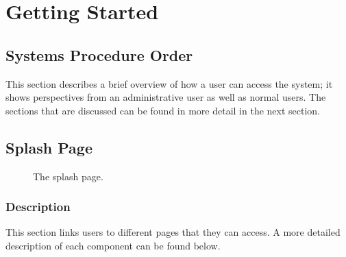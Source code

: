 \documentclass[14pt, a4paper]{article}
\begin{document}
\section{Getting Started}
\subsection{Systems Procedure Order}
This section describes a brief overview of how a user can access the system; it shows perspectives from an administrative user as well as normal users. The sections that are discussed can be found in more detail in the next section.
\subsection{Splash Page}
\begin{figure}[H]
\caption{The splash page.}
\label{fig:splash1}
\end{figure}
\subsubsection{Description}
This section links users to different pages that they can access. A more detailed description of each component can be found below.
\end{document}
